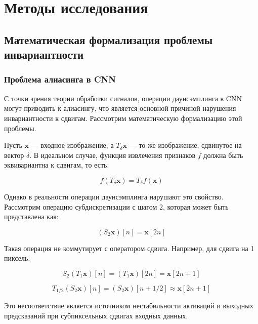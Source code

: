 \chapter{Методы исследования} \label{methods}

\section{Математическая формализация проблемы инвариантности}
\label{methods:math}

\subsection{Проблема алиасинга в CNN}
\label{methods:math:aliasing}

С точки зрения теории обработки сигналов, операции даунсэмплинга в CNN могут приводить к алиасингу, что является основной причиной нарушения инвариантности к сдвигам. Рассмотрим математическую формализацию этой проблемы.

Пусть $\mathbf{x}$ — входное изображение, а $T_{\delta}\mathbf{x}$ — то же изображение, сдвинутое на вектор $\delta$. В идеальном случае, функция извлечения признаков $f$ должна быть эквивариантна к сдвигам, то есть:

\begin{equation}
f(T_{\delta}\mathbf{x}) = T_{\delta}f(\mathbf{x})
\end{equation}

Однако в реальности операции даунсэмплинга нарушают это свойство. Рассмотрим операцию субдискретизации с шагом 2, которая может быть представлена как:

\begin{equation}
(S_2 \mathbf{x})[n] = \mathbf{x}[2n]
\end{equation}

Такая операция не коммутирует с оператором сдвига. Например, для сдвига на 1 пиксель:

\begin{equation}
S_2(T_1 \mathbf{x})[n] = (T_1 \mathbf{x})[2n] = \mathbf{x}[2n+1]
\end{equation}

\begin{equation}
T_{1/2}(S_2 \mathbf{x})[n] = (S_2 \mathbf{x})[n+1/2] \approx \mathbf{x}[2n+1]
\end{equation}

Это несоответствие является источником нестабильности активаций и выходных предсказаний при субпиксельных сдвигах входных данных.


